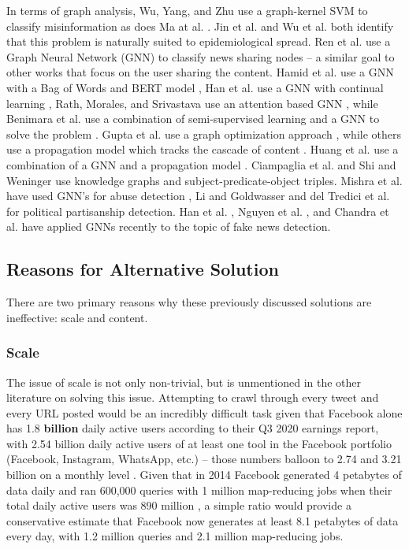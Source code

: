 \documentclass[preprint,12pt]{elsarticle}
\begin{document}
In terms of graph analysis, Wu, Yang, and Zhu \cite{wu2015false} use a graph-kernel SVM to classify misinformation as does Ma at al. \cite{ma2017detect}. Jin et al. \cite{jin2013epidemiological} and Wu et al. \cite{wu2016mining} both identify that this problem is naturally suited to epidemiological spread. Ren et al. use a Graph Neural Network (GNN) to classify news sharing nodes \cite{ren2020adversarial} -- a similar goal to other works that focus on the user sharing the content. Hamid et al. use a GNN with a Bag of Words and BERT model \cite{hamid2020fake}, Han et al. use a GNN with continual learning \cite{han2020graph}, Rath, Morales, and Srivastava use an attention based GNN \cite{rath2021scarlet}, while Benimara et al. use a combination of semi-supervised learning and a GNN to solve the problem \cite{benamira2019semi}. Gupta et al. use a graph optimization approach \cite{gupta2012evaluating}, while others use a propagation model which tracks the cascade of content \cite{jin2016news,jin2014news,zhou2018fake,kashima2003marginalized}. Huang et al. use a combination of a GNN and a propagation model \cite{huang2019deep}. Ciampaglia et al. \cite{ciampaglia2015computational} and Shi and Weninger \cite{shi2016discriminative} use knowledge graphs and subject-predicate-object triples. Mishra et al. have used GNN's for abuse detection \cite{mishra2019abusive}, Li and Goldwasser \cite{li2019encoding} and del Tredici et al. \cite{del2019you} for political partisanship detection. Han et al. \cite{han2020graph}, Nguyen et al. \cite{nguyen2020fang}, and Chandra et al. \cite{chandra2020graph} have applied GNNs recently to the topic of fake news detection. 
 
\subsection{Reasons for Alternative Solution}
There are two primary reasons why these previously discussed solutions are ineffective: scale and content.

\subsubsection{Scale}
The issue of scale is not only non-trivial, but is unmentioned in the other literature on solving this issue. Attempting to crawl through every tweet and every URL posted would be an incredibly difficult task given that Facebook alone has 1.8 \textbf{billion} daily active users according to their Q3 2020 earnings report, with 2.54 billion daily active users of at least one tool in the Facebook portfolio (Facebook, Instagram, WhatsApp, etc.) --  those numbers balloon to 2.74 and 3.21 billion on a monthly level \cite{facebook2020q3}. Given that in 2014 Facebook generated 4 petabytes of data daily and ran 600,000 queries with 1 million map-reducing jobs when their total daily active users was 890 million \cite{bronson2015open}, a simple ratio would provide a conservative estimate that Facebook now generates at least 8.1 petabytes of data every day, with 1.2 million queries and 2.1 million map-reducing jobs. 
\end{document}
